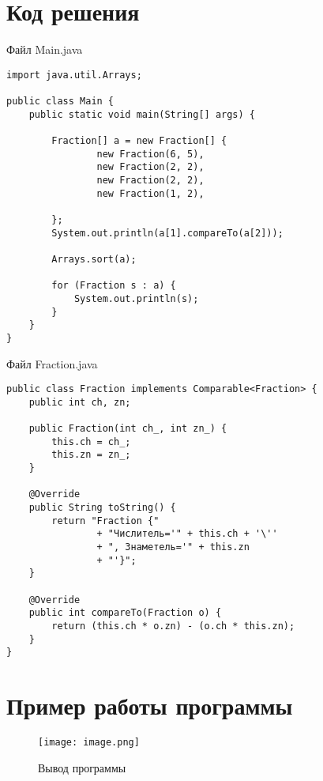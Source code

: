 \documentclass[12pt,a4paper,oneside,titlepage] {article}
\begin{document}
\section{Код решения}
Файл Main.java
\begin{verbatim}
import java.util.Arrays;

public class Main {
    public static void main(String[] args) {

        Fraction[] a = new Fraction[] {
                new Fraction(6, 5),
                new Fraction(2, 2),
                new Fraction(2, 2),
                new Fraction(1, 2),

        };
        System.out.println(a[1].compareTo(a[2]));

        Arrays.sort(a);

        for (Fraction s : a) {
            System.out.println(s);
        }
    }
}
\end{verbatim}
Файл Fraction.java
\begin{verbatim}
public class Fraction implements Comparable<Fraction> {
    public int ch, zn;

    public Fraction(int ch_, int zn_) {
        this.ch = ch_;
        this.zn = zn_;
    }

    @Override
    public String toString() {
        return "Fraction {"
                + "Числитель='" + this.ch + '\''
                + ", Знаметель='" + this.zn
                + "'}";
    }

    @Override
    public int compareTo(Fraction o) {
        return (this.ch * o.zn) - (o.ch * this.zn);
    }
}
\end{verbatim}

\section{Пример работы программы}
\begin{figure}[H]
    \centering
    \texttt{[image: image.png]}
    \caption{Вывод программы}
    \label{fig:my_label}
\end{figure}
\end{document}

